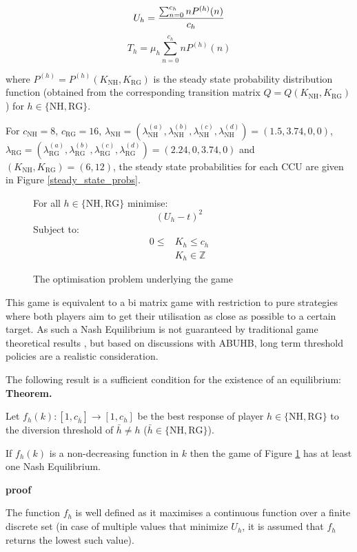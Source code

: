 \documentclass[a4paper,11pt]{article}
\newcommand{\NH}{\text{NH}}
\newcommand{\RG}{\text{RG}}
\begin{document}
$$U_{h}={{\sum_{n=0}^{c_h} nP^{(h)}(n)}\over{c_{h}}}$$
$$T_{h}=\mu_h \sum _{n=0}^{c_h} nP^{(h)}(n)$$

where $P^{(h)}=P^{(h)}(K_{\NH},K_{\RG})$ is the steady state probability distribution function (obtained from the corresponding transition matrix $Q=Q(K_{\NH},K_{\RG})$) for $h\in\{\text{NH},\text{RG}\}$.

For $c_{\NH}=8$, $c_{\RG}=16$, $\lambda_{\NH}=(\lambda_{\NH}^{(a)},\lambda_{\NH}^{(b)},\lambda_{\NH}^{(c)},\lambda_{\NH}^{(d)})=(1.5,3.74,0,0)$, $\lambda_{\RG}=(\lambda_{\RG}^{(a)},\lambda_{\RG}^{(b)},\lambda_{\RG}^{(c)},\lambda_{\RG}^{(d)})=(2.24,0,3.74,0)$ and $(K_{\NH},K_{\RG})=(6,12)$, the steady state probabilities for each CCU are given in Figure \ref{steady_state_probs}.


\begin{figure}[!htbp]
\hspace{2cm}For all $h\in\{\text{NH}, \text{RG}\}$ minimise:
$$\left(U_{h}-t\right)^2$$
\hspace{2cm}Subject to:
\begin{align}
0\leq & K_h \leq c_{h}\nonumber\\
&K_h \in  \mathbb{Z}\nonumber
\end{align}
\caption{The optimisation problem underlying the game}\label{model1}
\end{figure}

This game is equivalent to a bi matrix game with restriction to pure strategies where both players aim to get their utilisation as close as possible to a certain target.
As such a Nash Equilibrium is not guaranteed by traditional game theoretical results \cite{Nash1950}, but based on discussions with ABUHB, long term threshold policies are a realistic consideration.

The following result is a sufficient condition for the existence of an equilibrium:\\


\textbf{Theorem.}

Let $f_{h}(k):[1,c_{\bar h}]\to[1,c_h]$ be the best response of player $h\in\{\NH, \RG\}$ to the diversion threshold of $\bar h\ne h$ ($\bar h\in\{\NH, \RG\}$).

If $f_{h}(k)$ is a non-decreasing function in $k$ then the game of Figure \ref{model1} has at least one Nash Equilibrium.


\textbf{proof}

The function $f_h$ is well defined as it maximises a continuous function over a finite discrete set (in case of multiple values that minimize $U_h$, it is assumed that $f_h$ returns the lowest such value).
\end{document}

